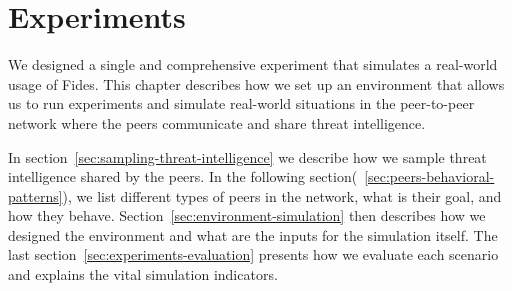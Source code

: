 \chapter{Experiments}
\label{ch:experiments}
We designed a single and comprehensive experiment that simulates a real-world usage of Fides. This chapter describes how we set up an environment that allows us to run experiments and simulate real-world situations in the peer-to-peer network where the peers communicate and share threat intelligence.

In section~\ref{sec:sampling-threat-intelligence} we describe how we sample threat intelligence shared by the peers.
In the following section(~\ref{sec:peers-behavioral-patterns}), we list different types of peers in the network, what is their goal, and how they behave.
Section~\ref{sec:environment-simulation} then describes how we designed the environment and what are the inputs for the simulation itself.
The last section~\ref{sec:experiments-evaluation} presents how we evaluate each scenario and explains the vital simulation indicators.







